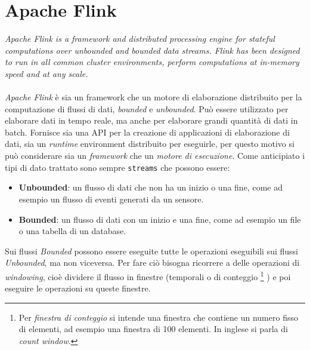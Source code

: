 \section{Apache Flink}
\label{sec:flink_overview}
\textit{Apache Flink is a framework and distributed processing engine for stateful computations over unbounded and bounded data streams. Flink has been designed to run in all common cluster environments, perform computations at in-memory speed and at any scale.}\cite*{flinkwebsite}\\\\

\textit{Apache Flink} è sia un framework che un motore di elaborazione distribuito per la computazione di flussi di dati, \textit{bounded} e \textit{unbounded}.
Può essere utilizzato per elaborare dati in tempo reale, ma anche per elaborare grandi quantità di dati in batch.
Fornisce sia una API per la creazione di applicazioni di elaborazione di dati, sia un \textit{runtime} environment distribuito per eseguirle,
per questo motivo si può considerare sia un \textit{framework} che un \textit{motore di esecuzione}.
Come anticipiato i tipi di dato trattato sono sempre \texttt{streams} che possono essere:
\begin{itemize}
    \item \textbf{Unbounded}: un flusso di dati che non ha un inizio o una fine, come ad esempio un flusso di eventi generati da un sensore.
    \item \textbf{Bounded}: un flusso di dati con un inizio e una fine, come ad esempio un file o una tabella di un database.
\end{itemize}
Sui flussi \textit{Bounded} possono essere eseguite tutte le operazioni eseguibili sui flussi \textit{Unbounded}, ma non viceversa.
Per fare ciò bisogna ricorrere a delle operazioni di \textit{windowing}, cioè dividere il flusso in finestre (temporali o di conteggio 
\footnote{Per \textit{finestra di conteggio} si intende una finestra che contiene un numero fisso di elementi, ad esempio una finestra di 100 elementi.
In inglese si parla di \textit{count window}.}
) e poi eseguire le operazioni su queste finestre.

